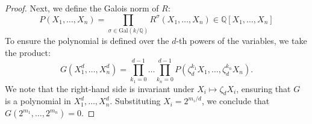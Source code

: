 \documentclass[10pt]{amsart}
\numberwithin{equation}{section}
\theoremstyle{plain}
\theoremstyle{definition}
\begin{document}
\begin{proof}
Next, we define the Galois norm of $R$:
\[ P(X_1, \dots, X_n) = \prod_{\sigma \in \text{Gal}(k/\mathbb{Q})} R^\sigma(X_1, \dots, X_n) \in \mathbb{Q}[X_1, \dots, X_n] \]
To ensure the polynomial is defined over the $d$-th powers of the variables, we take the product:
\[ G(X_1^d, \dots, X_n^d) = \prod_{k_1=0}^{d-1} \dots \prod_{k_n=0}^{d-1} P(\zeta_d^{k_1}X_1, \dots, \zeta_d^{k_n}X_n). \]
We note that the right-hand side is invariant under $X_i \mapsto \zeta_d X_i$, ensuring that $G$ is a polynomial in $X_1^d, \dots, X_n^d$. Substituting $X_i = 2^{m_i/d}$, we conclude that $G(2^{m_1}, \dots, 2^{m_n}) = 0$.
\end{proof}
\end{document}

